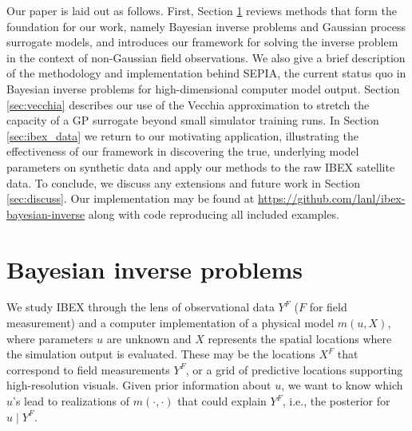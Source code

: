 \documentclass[11pt]{article}
\begin{document}
Our paper is laid out as follows. First, Section \ref{sec:review} reviews
methods that form the foundation for our work, namely Bayesian inverse problems
and Gaussian process surrogate models, and introduces our framework for solving
the inverse problem in the context of non-Gaussian field observations. We also
give a brief description of the methodology and implementation behind SEPIA,
the current status quo in Bayesian inverse problems for high-dimensional
computer model output. Section \ref{sec:vecchia} describes our use of the
Vecchia approximation to stretch the capacity of a GP surrogate beyond small
simulator training runs. In Section \ref{sec:ibex_data} we return to our
motivating application, illustrating the effectiveness of our framework in
discovering the true, underlying model parameters on synthetic data and apply
our methods to the raw IBEX satellite data. To conclude, we discuss any
extensions and future work in Section \ref{sec:discuss}. Our implementation may
be found at \url{https://github.com/lanl/ibex-bayesian-inverse} along with code
reproducing all included examples.



\section{Bayesian inverse problems}
\label{sec:review}

We study IBEX through the lens of observational data $Y^F$ ($F$ for field
measurement) and a computer implementation of a physical model $m(u, X)$,
where parameters $u$ are unknown and $X$ represents the spatial locations
where the simulation output is evaluated.  These may be the locations $X^F$
that correspond to field measurements $Y^F$, or a grid of predictive locations
supporting high-resolution visuals.  Given prior information about $u$, we
want to know which $u$'s lead to realizations of $m(\cdot, \cdot)$ that could
explain $Y^F$, i.e., the posterior for $u \mid Y^F$.
\end{document}
